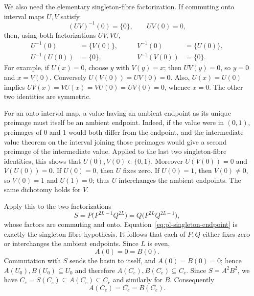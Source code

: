 \documentclass[11pt]{article}
\theoremstyle{definition}
\theoremstyle{remark}
\begin{document}
We also need the elementary singleton-fibre factorization.  If commuting
onto interval maps \(U,V\) satisfy
\[
 (UV)^{-1}(0)=\{0\},\qquad UV(0)=0,
\]
then, using both factorizations \(UV,VU\),
\[
\begin{alignedat}{2}
 U^{-1}(0)&=\{V(0)\},\qquad&V^{-1}(0)&=\{U(0)\},\\
 U^{-1}(U(0))&=\{0\},&V^{-1}(V(0))&=\{0\}.
\end{alignedat}
\]
For example, if $U(x)=0$, choose $y$ with $V(y)=x$; then
$UV(y)=0$, so $y=0$ and $x=V(0)$.  Conversely $U(V(0))=UV(0)=0$.
Also, $U(x)=U(0)$ implies
$UV(x)=VU(x)=VU(0)=UV(0)=0$, whence $x=0$.  The other two identities are
symmetric.

For an onto interval map, a value having an ambient endpoint as its unique
preimage must itself be an ambient endpoint.  Indeed, if the value were in
$(0,1)$, preimages of $0$ and $1$ would both differ from the endpoint, and
the intermediate value theorem on the interval joining those preimages
would give a second preimage of the intermediate value.  Applied to the last
two singleton-fibre identities, this shows that $U(0),V(0)\in\{0,1\}$.
Moreover $U(V(0))=0$ and $V(U(0))=0$.  If $U(0)=0$, then $U$ fixes zero.
If $U(0)=1$, then $V(0)\neq0$, so $V(0)=1$ and $U(1)=0$; thus $U$
interchanges the ambient endpoints.  The same dichotomy holds for $V$.

Apply this to the two factorizations
\[
 S=P\bigl(P^{2L-1}Q^{2L}\bigr)
  =Q\bigl(P^{2L}Q^{2L-1}\bigr),
\]
whose factors are commuting and onto.  Equation~\eqref{eq:pl-singleton-endpoint}
is exactly the singleton-fibre hypothesis.  It follows that each of \(P,Q\)
either fixes zero or interchanges the ambient endpoints.  Since \(L\) is even,
\[
 A(0)=0=B(0).
\]
Commutation with $S$ sends the basin to itself, and $A(0)=B(0)=0$; hence
$A(U_0),B(U_0)\subseteq U_0$ and therefore
\(A(C_e),B(C_e)\subseteq C_e\).  Since
\(S=A^2B^2\), we have
$C_e=S(C_e)\subseteq A(C_e)\subseteq C_e$ and similarly for $B$.
Consequently
\[
 A(C_e)=C_e=B(C_e).
\]
\end{document}
